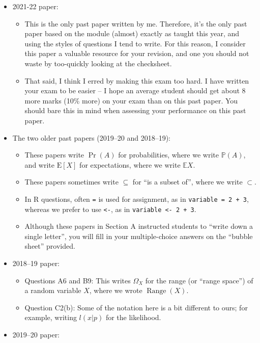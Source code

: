 \documentclass[
  letterpaper,
  DIV=11,
  numbers=noendperiod]{scrreprt}
\providecommand{\tightlist}{%
  \setlength{\itemsep}{0pt}\setlength{\parskip}{0pt}}\usepackage{longtable,booktabs,array}
\theoremstyle{remark}
\begin{document}
\begin{itemize}
\tightlist
\item
  2021-22 paper:

  \begin{itemize}
  \tightlist
  \item
    This is the only past paper written by me. Therefore, it's the only
    past paper based on the module (almost) exactly as taught this year,
    and using the styles of questions I tend to write. For this reason,
    I consider this paper a valuable resource for your revision, and one
    you should not waste by too-quickly looking at the checksheet.
  \item
    That said, I think I erred by making this exam too hard. I have
    written your exam to be easier -- I hope an average student should
    get about 8 more marks (10\% more) on your exam than on this past
    paper. You should bare this in mind when assessing your performance
    on this past paper.
  \end{itemize}
\item
  The two older past papers (2019--20 and 2018--19):

  \begin{itemize}
  \tightlist
  \item
    These papers write \(\Pr(A)\) for probabilities, where we write
    \(\mathbb P(A)\), and write \(\mathrm{E}[X]\) for expectations,
    where we write \(\mathbb EX\).
  \item
    These papers sometimes write \(\subseteq\) for ``is a subset of'',
    where we write \(\subset\).
  \item
    In R questions, often \texttt{=} is used for assignment, as in
    \texttt{variable\ =\ 2\ +\ 3}, whereas we prefer to use
    \texttt{\textless{}-}, as in
    \texttt{variable\ \textless{}-\ 2\ +\ 3}.
  \item
    Although these papers in Section A instructed students to ``write
    down a single letter'', you will fill in your multiple-choice
    answers on the ``bubble sheet'' provided.
  \end{itemize}
\item
  2018--19 paper:

  \begin{itemize}
  \tightlist
  \item
    Questions A6 and B9: This writes \(\Omega_X\) for the range (or
    ``range space'') of a random variable \(X\), where we wrote
    \(\operatorname{Range}(X)\).
  \item
    Question C2(b): Some of the notation here is a bit different to
    ours; for example, writing \(l(x|p)\) for the likelihood.
  \end{itemize}
\item
  2019--20 paper:


\end{itemize}
\end{document}
